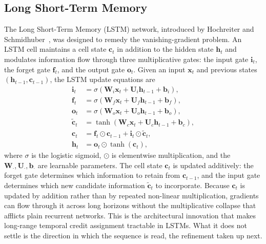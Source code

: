 \documentclass[%
    BCOR=10mm,
    DIV=13,
    toc=bibliography,
    toc=listof,
    oneside,
    12pt,
]{scrbook}
\begin{document}
\subsection{Long Short-Term Memory}
\label{subsec:lstm}

The Long Short-Term Memory (LSTM) network, introduced by Hochreiter and
Schmidhuber~\cite{hochreiter1997}, was designed to remedy the
vanishing-gradient problem. An LSTM cell maintains a cell state $\mathbf{c}_t$
in addition to the hidden state $\mathbf{h}_t$ and modulates information flow
through three multiplicative gates: the input gate $\mathbf{i}_t$, the forget
gate $\mathbf{f}_t$, and the output gate $\mathbf{o}_t$. Given an input
$\mathbf{x}_t$ and previous states $(\mathbf{h}_{t-1}, \mathbf{c}_{t-1})$, the
LSTM update equations are \begin{subequations} \begin{align} \mathbf{i}_t &=
\sigma\!\left( \mathbf{W}_i \mathbf{x}_t + \mathbf{U}_i \mathbf{h}_{t-1} +
\mathbf{b}_i \right), \label{eq:lstm_i}\\ \mathbf{f}_t &= \sigma\!\left(
\mathbf{W}_f \mathbf{x}_t + \mathbf{U}_f \mathbf{h}_{t-1} + \mathbf{b}_f
\right), \label{eq:lstm_f}\\ \mathbf{o}_t &= \sigma\!\left( \mathbf{W}_o
\mathbf{x}_t + \mathbf{U}_o \mathbf{h}_{t-1} + \mathbf{b}_o \right),
\label{eq:lstm_o}\\ \tilde{\mathbf{c}}_t &= \tanh\!\left( \mathbf{W}_c
\mathbf{x}_t + \mathbf{U}_c \mathbf{h}_{t-1} + \mathbf{b}_c \right),
\label{eq:lstm_ctilde}\\ \mathbf{c}_t &= \mathbf{f}_t \odot \mathbf{c}_{t-1} +
\mathbf{i}_t \odot \tilde{\mathbf{c}}_t, \label{eq:lstm_c}\\ \mathbf{h}_t &=
\mathbf{o}_t \odot \tanh(\mathbf{c}_t), \label{eq:lstm_h} \end{align}
\end{subequations} where $\sigma$ is the logistic sigmoid, $\odot$ is
elementwise multiplication, and the $\mathbf{W}_\cdot, \mathbf{U}_\cdot,
\mathbf{b}_\cdot$ are learnable parameters. The cell state $\mathbf{c}_t$ is
updated additively: the forget gate determines which information to retain
from $\mathbf{c}_{t-1}$, and the input gate determines which new candidate
information $\tilde{\mathbf{c}}_t$ to incorporate. Because $\mathbf{c}_t$ is
updated by addition rather than by repeated non-linear multiplication,
gradients can flow through it across long horizons without the multiplicative
collapse that afflicts plain recurrent networks. This is the architectural
innovation that makes long-range temporal credit assignment tractable in
LSTMs. What it does not settle is the direction in which the sequence is read,
the refinement taken up next.
\end{document}
